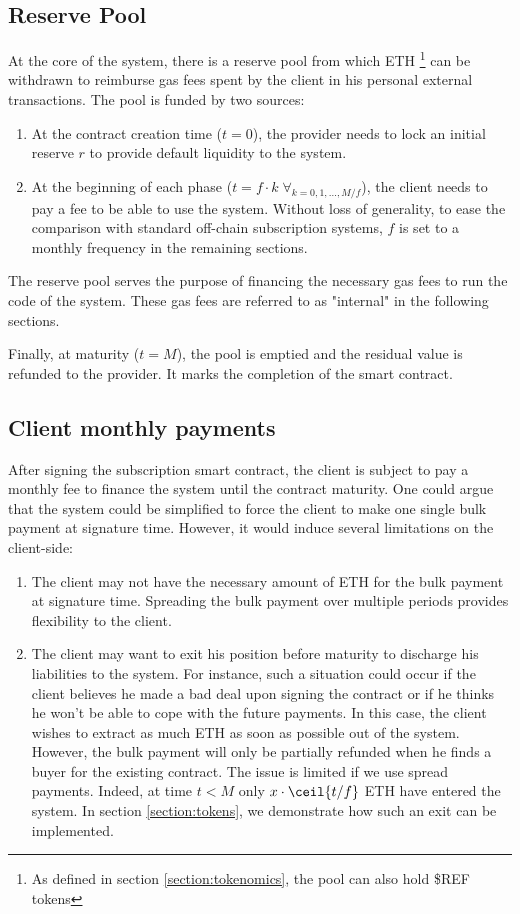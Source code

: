 \subsection{Reserve Pool}
At the core of the system, there is a reserve pool from which ETH \footnote{As defined in section \ref{section:tokenomics}, the pool can also hold \$REF tokens} can be withdrawn to reimburse gas fees spent by the client in his personal external transactions. The pool is funded by two sources: 
\begin{enumerate}
    \item At the contract creation time ($t=0$), the provider needs to lock an initial reserve $r$ to provide default liquidity to the system.
    \item At the beginning of each phase ($t = f \cdot k \; \forall_{k = 0,1,\ldots,M/f}$), the client needs to pay a fee to be able to use the system. Without loss of generality, to ease the comparison with standard off-chain subscription systems, $f$ is set to a monthly frequency in the remaining sections.
\end{enumerate}
The reserve pool serves the purpose of financing the necessary gas fees to run the code of the system. These gas fees are referred to as "internal" in the following sections.

Finally, at maturity ($t=M$), the pool is emptied and the residual value is refunded to the provider. It marks the completion of the smart contract.

\subsection{Client monthly payments}

After signing the subscription smart contract, the client is subject to pay a monthly fee to finance the system until the contract maturity. One could argue that the system could be simplified to force the client to make one single bulk payment at signature time. However, it would induce several limitations on the client-side:
\begin{enumerate}
    \item \label{point:client-payment:bulk} The client may not have the necessary amount of ETH for the bulk payment at signature time. Spreading the bulk payment over multiple periods provides flexibility to the client.
    \item \label{point:client-payment:exit} The client may want to exit his position before maturity to discharge his liabilities to the system. For instance, such a situation could occur if the client believes he made a bad deal upon signing the contract or if he thinks he won't be able to cope with the future payments. In this case, the client wishes to extract as much ETH as soon as possible out of the system. However, the bulk payment will only be partially refunded when he finds a buyer for the existing contract. The issue is limited if we use spread payments. Indeed, at time $t < M$ only $  x \cdot \ceil{t/f} $ ETH have entered the system. In section \ref{section:tokens}, we demonstrate how such an exit can be implemented.
\end{enumerate}

